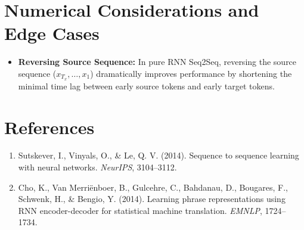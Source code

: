 \documentclass[11pt,a4paper]{article}
\theoremstyle{definition}
\begin{document}
\section{Numerical Considerations and Edge Cases}

\begin{itemize}
    \item \textbf{Reversing Source Sequence:} In pure RNN Seq2Seq, reversing the source sequence ($x_{T_x}, \dots, x_1$) dramatically improves performance by shortening the minimal time lag between early source tokens and early target tokens.
\end{itemize}

\section{References}
\begin{enumerate}
    \item Sutskever, I., Vinyals, O., \& Le, Q. V. (2014). Sequence to sequence learning with neural networks. \emph{NeurIPS}, 3104--3112.
    \item Cho, K., Van Merri{\"e}nboer, B., Gulcehre, C., Bahdanau, D., Bougares, F., Schwenk, H., \& Bengio, Y. (2014). Learning phrase representations using RNN encoder-decoder for statistical machine translation. \emph{EMNLP}, 1724--1734.
\end{enumerate}
\end{document}
